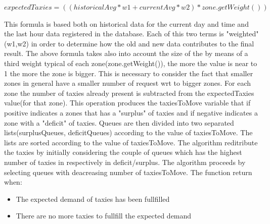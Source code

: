 \documentclass[11pt,titlepage]{article} %
\begin{document}
    $ expectedTaxies = ((historicalAvg*w1+currentAvg*w2)*zone.getWeight()) $\newline

  This formula is based both on historical data for the current day and time and
  the last hour data registered in the database.
  Each of this two terms is "weighted" (w1,w2) in order to determine how
  the old and new data contributes to the final result.
  The above formula takes also into account the size of the by means of a third
  weight typical of each zone(zone.getWeight()), the more the value is near to 1
  the more the zone is bigger. This is necessary to consider the fact that smaller
  zones in general have a smaller number of request wrt to bigger zones.
  For each zone the number of taxies already present is subtracted from the
  expectedTaxies value(for that zone). This operation produces the taxiesToMove
  variable that if positive indicates a zones that has a "surplus" of taxies and
  if negative indicates a zone with a "deficit" of taxies.
  Queues are then divided into two separated lists(surplusQueues, deficitQueues)
  according to the value of taxiesToMove.
  The lists are sorted according to the value of taxiesToMove.
  The algorithm reditribute the taxies by initially considering the couple of queues which
  has the highest number of taxies in respectively in deficit/surplus.
  The algorithm proceeds by selecting queues with deacreasing number of taxiesToMove.
  The function return when:
\begin{itemize}
    \item The expected demand of taxies has been fullfilled
    \item There are no more taxies to fullfill the expected demand
\end{itemize}
\end{document}
